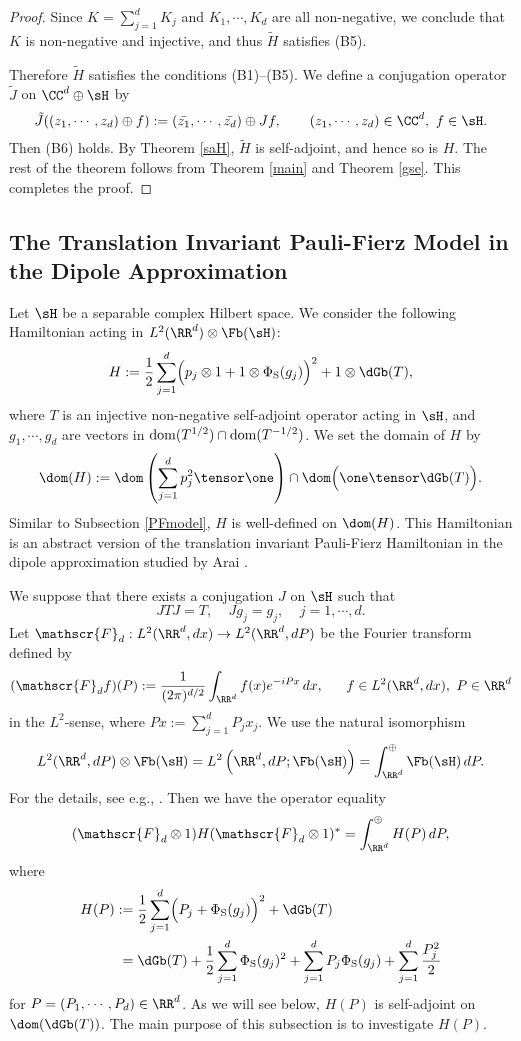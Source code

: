\documentclass[12pt,draft]{article}
\theoremstyle{plain}
\numberwithin{equation}{section}
\theoremstyle{remark}
\begin{document}
\begin{proof}
Since $K=\sum_{j=1}^dK_j$ and $K_1,\cdots,K_d$ are all non-negative,
we conclude that $K$ is non-negative and injective, and thus $\tilde{H}$ satisfies (B5).

Therefore $\tilde{H}$ satisfies the conditions (B1)--(B5).
We define a conjugation operator $\tilde{J}$ on $\CC^d\oplus\sH$ by
\[
\tilde{J}((z_1,\cdots,z_d)\oplus f):=(\bar{z_1},\cdots,\bar{z_d})\oplus Jf,\qquad (z_1,\cdots,z_d)\in\CC^d,\ f\in\sH.
\]
Then (B6) holds.
By Theorem \ref{saH}, $\tilde{H}$ is self-adjoint, and hence so is $H$. 
The rest of the theorem follows from Theorem \ref{main} and Theorem \ref{gse}.
This completes the proof.
\end{proof}



\subsection{The Translation Invariant Pauli-Fierz Model in the Dipole Approximation}\label{translation PF}
Let $\sH$ be a separable complex Hilbert space.
We consider the following Hamiltonian acting in $L^2(\RR^d)\otimes\Fb(\sH)$: 
\[
H:=\frac{1}{2}\sum_{j=1}^{d}\Bigl(p_j\otimes 1+1\otimes\Phi_{\rm S}(g_j)\Bigr)^2 +1\otimes\dGb(T),
\]
where $T$ is an injective non-negative self-adjoint operator acting in $\sH$,
and $g_1,\cdots,g_d$ are vectors in ${\rm dom}(T^{1/2})\cap{\rm dom}(T^{-1/2})$.
We set the domain of $H$ by
\begin{equation}
 \dom(H) 
 := \dom\left(\sum_{j=1}^d p_j^2\tensor\one\right) \cap \dom\Big( \one\tensor \dGb(T)\Big).  
\end{equation}
Similar to Subsection \ref{PFmodel}, $H$ is well-defined on $\dom(H)$.
This Hamiltonian is an abstract version of the translation invariant Pauli-Fierz Hamiltonian in the dipole approximation studied by Arai \cite{A83b}.

We suppose that there exists a conjugation $J$ on $\sH$ such that 
\[
JTJ=T,\ \ \ \ \ Jg_j=g_j,\ \ \ \ \ j=1,\cdots,d.
\]
Let $\mathscr{F}_d:L^2(\RR^d,dx)\to L^2(\RR^d,dP)$ be the Fourier transform defined by
\[
(\mathscr{F}_df)(P) := \frac{1}{(2\pi)^{d/2}}\int_{\RR^d}f(x)e^{-iPx}\,dx,\ \ \ \ \ f\in L^2(\RR^d,dx),\ P\in\RR^d
\]
in the $L^2$-sense, where $Px:=\sum_{j=1}^dP_jx_j$.
We use the natural isomorphism
\[
L^2(\RR^d,dP)\otimes\Fb(\sH) = L^2\left(\RR^d,dP;\Fb(\sH)\right) = \int_{\RR^d}^\oplus\Fb(\sH)\,dP.
\]
For the details, see e.g., \cite[Section 2.7, 2.8 and 3.11]{A18}.
Then we have the operator equality
\[
(\mathscr{F}_d\otimes1)H(\mathscr{F}_d\otimes1)^*
= \int_{\RR^d}^{\oplus}H(P)\,dP,
\]
where
\begin{align*}
H(P)&:=\frac{1}{2}\sum_{j=1}^{d}\Bigl(P_j+\Phi_{\rm S}(g_j)\Bigr)^2 +\dGb(T)\\
&\phantom{:}=\dGb(T)+\frac{1}{2}\sum_{j=1}^{d}\Phi_{\rm S}(g_j)^2
+\sum_{j=1}^{d}P_j\Phi_{\rm S}(g_j)+\sum_{j=1}^{d}\frac{P_j^2}{2}
\end{align*}
for $P=(P_1,\cdots,P_d)\in\RR^d$.
As we will see below, $H(P)$ is self-adjoint on $\dom(\dGb(T))$.
The main purpose of this subsection is to investigate $H(P)$.
\end{document}
